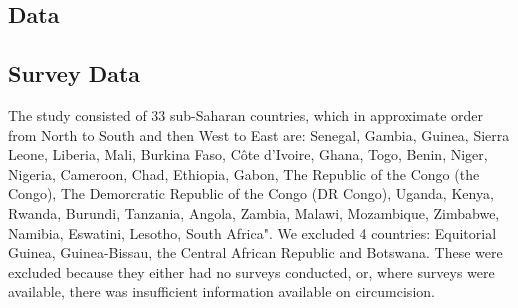 \documentclass{article}
\begin{document}
\begin{appendix}


\newpage

\tableofcontents

\newpage


\section{Data}
\label{sec:org8802288}



\subsection{Survey Data}
\label{sec:org09db5e8}


The study consisted of 33 sub-Saharan countries, which in approximate order from North to South and then West to East are: Senegal, Gambia, Guinea, Sierra Leone, Liberia, Mali, Burkina Faso, Côte d’Ivoire, Ghana, Togo, Benin, Niger, Nigeria, Cameroon, Chad, Ethiopia, Gabon, The Republic of the Congo (the Congo), The Demorcratic Republic of the Congo (DR Congo), Uganda, Kenya, Rwanda, Burundi, Tanzania, Angola, Zambia, Malawi, Mozambique, Zimbabwe, Namibia, Eswatini, Lesotho, South Africa". 
We excluded 4 countries: Equitorial Guinea, Guinea-Bissau, the Central African Republic and Botswana. These were excluded because they either had no surveys conducted, or, where surveys were available, there was insufficient information available on circumcision.  


\end{appendix}
\end{document}

